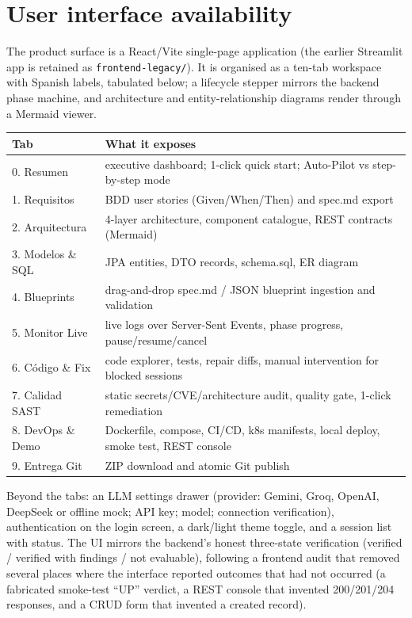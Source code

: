 \documentclass[11pt,a4paper]{article}
\begin{document}
\section{User interface availability}

The product surface is a React/Vite single-page application (the earlier Streamlit
app is retained as \texttt{frontend-legacy/}). It is organised as a ten-tab workspace
with Spanish labels, tabulated below; a lifecycle stepper mirrors the backend phase
machine, and architecture and entity-relationship diagrams render through a Mermaid
viewer.

\begin{center}
\begin{longtable}{@{}p{}p{}@{}}
\toprule
\textbf{Tab} & \textbf{What it exposes} \\
\midrule
0. Resumen & executive dashboard; 1-click quick start; Auto-Pilot vs step-by-step mode \\
1. Requisitos & BDD user stories (Given/When/Then) and spec.md export \\
2. Arquitectura & 4-layer architecture, component catalogue, REST contracts (Mermaid) \\
3. Modelos \& SQL & JPA entities, DTO records, schema.sql, ER diagram \\
4. Blueprints & drag-and-drop spec.md / JSON blueprint ingestion and validation \\
5. Monitor Live & live logs over Server-Sent Events, phase progress, pause/resume/cancel \\
6. Código \& Fix & code explorer, tests, repair diffs, manual intervention for blocked sessions \\
7. Calidad SAST & static secrets/CVE/architecture audit, quality gate, 1-click remediation \\
8. DevOps \& Demo & Dockerfile, compose, CI/CD, k8s manifests, local deploy, smoke test, REST console \\
9. Entrega Git & ZIP download and atomic Git publish \\
\bottomrule
\end{longtable}
\end{center}

Beyond the tabs: an LLM settings drawer (provider: Gemini, Groq, OpenAI, DeepSeek or
offline mock; API key; model; connection verification), authentication on the login
screen, a dark/light theme toggle, and a session list with status. The UI mirrors the
backend's honest three-state verification (verified / verified with findings / not
evaluable), following a frontend audit that removed several places where the interface
reported outcomes that had not occurred (a fabricated smoke-test ``UP'' verdict, a
REST console that invented 200/201/204 responses, and a CRUD form that invented a
created record).
\end{document}
